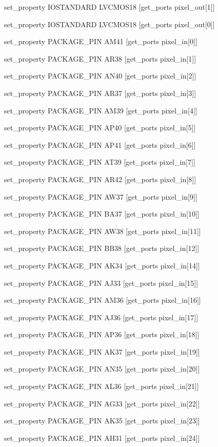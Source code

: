 set\_property IOSTANDARD LVCMOS18 [get\_ports {pixel\_out[1]}]

set\_property IOSTANDARD LVCMOS18 [get\_ports {pixel\_out[0]}]

set\_property PACKAGE\_PIN AM41 [get\_ports {pixel\_in[0]}]

set\_property PACKAGE\_PIN AR38 [get\_ports {pixel\_in[1]}]

set\_property PACKAGE\_PIN AN40 [get\_ports {pixel\_in[2]}]

set\_property PACKAGE\_PIN AR37 [get\_ports {pixel\_in[3]}]

set\_property PACKAGE\_PIN AM39 [get\_ports {pixel\_in[4]}]

set\_property PACKAGE\_PIN AP40 [get\_ports {pixel\_in[5]}]

set\_property PACKAGE\_PIN AP41 [get\_ports {pixel\_in[6]}]

set\_property PACKAGE\_PIN AT39 [get\_ports {pixel\_in[7]}]

set\_property PACKAGE\_PIN AR42 [get\_ports {pixel\_in[8]}]

set\_property PACKAGE\_PIN AW37 [get\_ports {pixel\_in[9]}]

set\_property PACKAGE\_PIN BA37 [get\_ports {pixel\_in[10]}]

set\_property PACKAGE\_PIN AW38 [get\_ports {pixel\_in[11]}]

set\_property PACKAGE\_PIN BB38 [get\_ports {pixel\_in[12]}]

set\_property PACKAGE\_PIN AK34 [get\_ports {pixel\_in[14]}]

set\_property PACKAGE\_PIN AJ33 [get\_ports {pixel\_in[15]}]

set\_property PACKAGE\_PIN AM36 [get\_ports {pixel\_in[16]}]

set\_property PACKAGE\_PIN AJ36 [get\_ports {pixel\_in[17]}]

set\_property PACKAGE\_PIN AP36 [get\_ports {pixel\_in[18]}]

set\_property PACKAGE\_PIN AK37 [get\_ports {pixel\_in[19]}]

set\_property PACKAGE\_PIN AN35 [get\_ports {pixel\_in[20]}]

set\_property PACKAGE\_PIN AL36 [get\_ports {pixel\_in[21]}]

set\_property PACKAGE\_PIN AG33 [get\_ports {pixel\_in[22]}]

set\_property PACKAGE\_PIN AK35 [get\_ports {pixel\_in[23]}]

set\_property PACKAGE\_PIN AH31 [get\_ports {pixel\_in[24]}]

